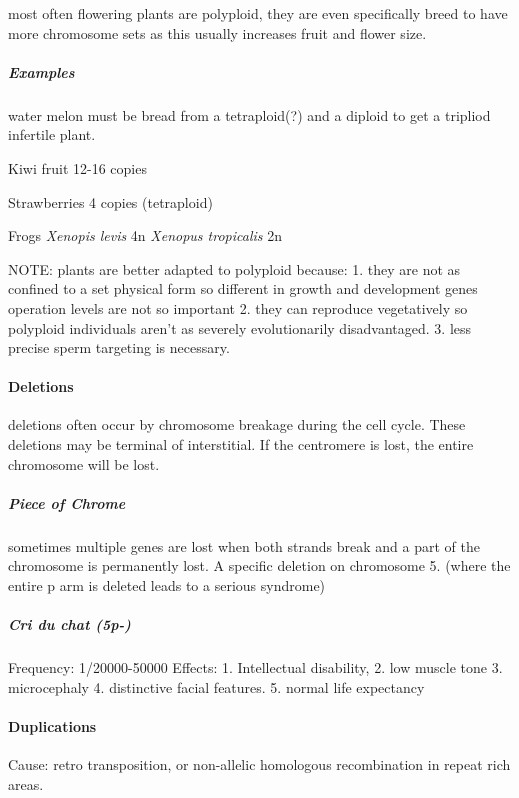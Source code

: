 \documentclass[]{article}
\let\oldparagraph\paragraph
\renewcommand{\paragraph}[1]{\oldparagraph{#1}\mbox{}}
\let\oldsubparagraph\subparagraph
\renewcommand{\subparagraph}[1]{\oldsubparagraph{#1}\mbox{}}
\begin{document}
most often flowering plants are polyploid, they are even specifically
breed to have more chromosome sets as this usually increases fruit and
flower size.

\hypertarget{examples-7}{%
\subparagraph{Examples}\label{examples-7}}

water melon must be bread from a tetraploid(?) and a diploid to get a
tripliod infertile plant.

Kiwi fruit 12-16 copies

Strawberries 4 copies (tetraploid)

Frogs \emph{Xenopis levis} 4n \emph{Xenopus tropicalis} 2n

NOTE: plants are better adapted to polyploid because: 1. they are not as
confined to a set physical form so different in growth and development
genes operation levels are not so important 2. they can reproduce
vegetatively so polyploid individuals aren't as severely evolutionarily
disadvantaged. 3. less precise sperm targeting is necessary.

\hypertarget{deletions-1}{%
\paragraph{Deletions}\label{deletions-1}}

deletions often occur by chromosome breakage during the cell cycle.
These deletions may be terminal of interstitial. If the centromere is
lost, the entire chromosome will be lost.

\hypertarget{piece-of-chrome-1}{%
\subparagraph{Piece of Chrome}\label{piece-of-chrome-1}}

sometimes multiple genes are lost when both strands break and a part of
the chromosome is permanently lost. A specific deletion on chromosome 5.
(where the entire p arm is deleted leads to a serious syndrome)

\hypertarget{cri-du-chat-5p--1}{%
\subparagraph{Cri du chat (5p-)}\label{cri-du-chat-5p--1}}

Frequency: 1/20000-50000 Effects: 1. Intellectual disability, 2. low
muscle tone 3. microcephaly 4. distinctive facial features. 5. normal
life expectancy

\hypertarget{duplications-1}{%
\paragraph{Duplications}\label{duplications-1}}

Cause: retro transposition, or non-allelic homologous recombination in
repeat rich areas.
\end{document}
